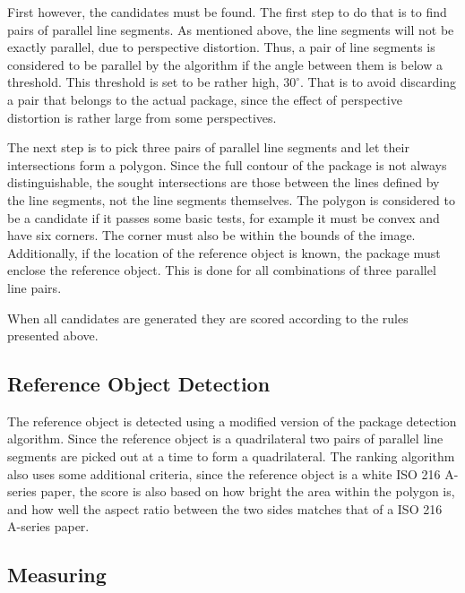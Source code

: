 First however, the candidates must be found.
The first step to do that is to find pairs of parallel line segments. 
As mentioned above, the line segments will not be exactly parallel, due to perspective distortion. %
Thus, a pair of line segments is considered to be parallel by the algorithm if the angle between them is below a threshold. 
This threshold is set to be rather high, $30^\circ$.
That is to avoid discarding a pair that belongs to the actual package, since the effect of perspective distortion is rather large from some perspectives. %

The next step is to pick three pairs of parallel line segments and let their intersections form a polygon. 
Since the full contour of the package is not always distinguishable, the sought intersections are those between the lines defined by the line segments, not the line segments themselves. %
The polygon is considered to be a candidate if it passes some basic tests, for example it must be convex and have six corners. 
The corner must also be within the bounds of the image.
Additionally, if the location of the reference object is known, the package must enclose the reference object.
This is done for all combinations of three parallel line pairs.

When all candidates are generated they are scored according to the rules presented above.

\subsection{Reference Object Detection}

The reference object is detected using a modified version of the package detection algorithm.
Since the reference object is a quadrilateral two pairs of parallel line segments are picked out at a time to form a quadrilateral.
The ranking algorithm also uses some additional criteria, since the reference object is a white ISO 216 A-series  paper, the score is also based on how bright the area within the polygon is, and how well the aspect ratio between the two sides matches that of a ISO 216 A-series paper.

\subsection{Measuring}

